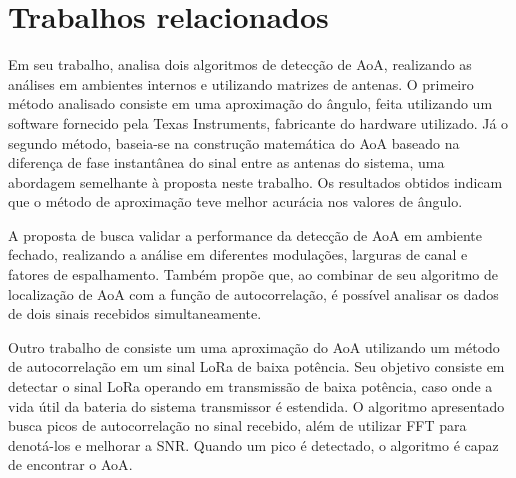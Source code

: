 \pagebreak


\pagebreak



\section{Trabalhos relacionados}

Em seu trabalho, \citeauthor{horst2021localization} \cite{horst2021localization} analisa dois algoritmos de detecção de \ac{AoA}, realizando as análises em ambientes internos e utilizando matrizes de antenas.
O primeiro método analisado consiste em uma aproximação do ângulo, feita utilizando um software fornecido pela Texas Instruments, fabricante do hardware utilizado.
Já o segundo método, baseia-se na construção matemática do \ac{AoA} baseado na diferença de fase instantânea do sinal entre as antenas do sistema, uma abordagem semelhante à proposta neste trabalho.
Os resultados obtidos indicam que o método de aproximação teve melhor acurácia nos valores de ângulo.

A proposta de \citeauthor{zeaiter:hal-03693641} \cite{zeaiter:hal-03693641} busca validar a performance da detecção de \ac{AoA} em ambiente fechado, realizando a análise em diferentes modulações, larguras de canal e fatores de espalhamento.
Também propõe que, ao combinar de seu algoritmo de localização de \ac{AoA} com a função de autocorrelação, é possível analisar os dados de dois sinais recebidos simultaneamente.

Outro trabalho de \citeauthor{zeaiter:hal-03932846} \cite{zeaiter:hal-03932846} consiste um uma aproximação do \ac{AoA} utilizando um método de autocorrelação em um sinal \ac{LoRa} de baixa potência.
Seu objetivo consiste em detectar o sinal \ac{LoRa} operando em transmissão de baixa potência, caso onde a vida útil da bateria do sistema transmissor é estendida.
O algoritmo apresentado busca picos de autocorrelação no sinal recebido, além de utilizar \ac{FFT} para denotá-los e melhorar a \ac{SNR}.
Quando um pico é detectado, o algoritmo é capaz de encontrar o \ac{AoA}.


